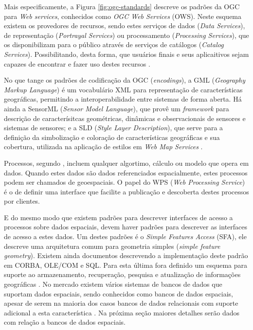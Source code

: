 \documentclass[diss]{template/setrem}
\begin{document}
Mais especificamente, a Figura \ref{fig:ogc-standards} descreve os padrões da OGC para \emph{Web services}, conhecidos como \emph{OGC Web Services} (OWS). Neste esquema existem os provedores de recursos, sendo estes serviços de dados (\emph{Data Services}), de representação (\emph{Portrayal Services}) ou processamento (\emph{Processing Services}), que os disponibilizam para o público através de serviços de catálogos (\emph{Catalog Services}). Possibilitando, desta forma, que usuários finais e seus aplicaitivos sejam capazes de encontrar e fazer uso destes recursos \citep{OSGeo2012}.

No que tange os padrões de codificação da OGC (\emph{encodings}), a GML (\emph{Geography Markup Language}) é um vocabulário XML para representação de características geográficas, permitindo a interoperabilidade entre sistemas de forma aberta. Há ainda a SensorML (\emph{Sensor Model Language}), que provê um \emph{framework} para descrição de caracterísitcas geométricas, dinâmicas e observacionais de sensores e sistemas de sensores; e a SLD (\emph{Style Layer Description}), que serve para a definição da simbolização e coloração de características geográficas e sua cobertura, utilizada na aplicação de estilos em \emph{Web Map Services} \citep{Percivall2011}.

Processos, segundo \citet{Percivall2011}, incluem qualquer algortimo, cálculo ou modelo que opera em dados. Quando estes dados são dados referenciados espacialmente, estes processos podem ser chamados de geoespaciais. O papel do WPS (\emph{Web Processing Service}) é o de definir uma interface que facilite a publicação e descoberta destes processos por clientes.

E do mesmo modo que existem padrões para descrever interfaces de acesso a processos sobre dados espaciais, devem haver padrões para descrever as interfaces de acesso a estes dados. Um destes padrões é o \emph{Simple Features Access} (SFA), ele descreve uma arquitetura comum para geometria simples (\emph{simple feature geometry}). Existem ainda documentos descrevendo a implementação deste padrão em CORBA, OLE/COM e SQL. Para esta última fora definido um esquema para suporte ao armazenamento, recuperação, pesquisa e atualização de informações geográficas \citep{Percivall2011}. No mercado existem vários sistemas de bancos de dados que suportam dados espaciais, sendo conhecidos como bancos de dados espaciais, apesar de serem na maioria dos casos bancos de dados relacionais com suporte adicional a esta característica \citep{Holdener2011}. Na próxima seção maiores detalhes serão dados com relação a bancos de dados espaciais.
\end{document}
